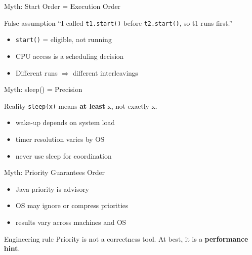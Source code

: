 \documentclass[aspectratio=169,11pt]{beamer}
\begin{document}
	\begin{frame}{Myth: Start Order = Execution Order}
		\begin{block}{False assumption}
			“I called \texttt{t1.start()} before \texttt{t2.start()}, so t1 runs first.”
		\end{block}
		
		\begin{itemize}
			\item \texttt{start()} = eligible, not running
			\item CPU access is a scheduling decision
			\item Different runs $\Rightarrow$ different interleavings
		\end{itemize}
	\end{frame}
	
	\begin{frame}{Myth: sleep() = Precision}
		\begin{block}{Reality}
			\texttt{sleep(x)} means \textbf{at least} x, not exactly x.
		\end{block}
		
		\begin{itemize}
			\item wake-up depends on system load
			\item timer resolution varies by OS
			\item never use sleep for coordination
		\end{itemize}
	\end{frame}
	
	\begin{frame}{Myth: Priority Guarantees Order}
		\begin{itemize}
			\item Java priority is advisory
			\item OS may ignore or compress priorities
			\item results vary across machines and OS
		\end{itemize}
		
		\vspace{3mm}
		\begin{block}{Engineering rule}
			Priority is not a correctness tool. At best, it is a \textbf{performance hint}.
		\end{block}
	\end{frame}
	
\end{document}
